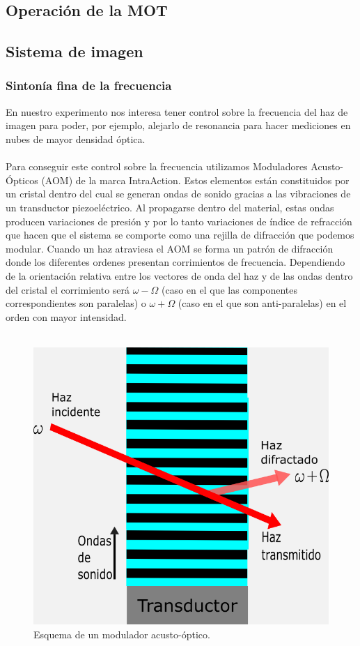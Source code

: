 \documentclass[12pt,twoside]{article}
\begin{document}
\subsection{Operación de la MOT}\label{operacion}



\subsection{Sistema de imagen}\label{Sisimag}

\subsubsection{Sintonía fina de la frecuencia}\label{Sintonia}

En nuestro experimento nos interesa tener control sobre la frecuencia del haz de imagen para poder, por ejemplo, alejarlo de resonancia para hacer mediciones en nubes de mayor densidad óptica.\\
\\
Para conseguir este control sobre la frecuencia utilizamos Moduladores Acusto-Ópticos (AOM) de la marca IntraAction. Estos elementos están constituidos por un cristal dentro del cual se generan ondas de sonido gracias a las vibraciones de un transductor piezoeléctrico. Al propagarse dentro del material, estas ondas producen variaciones de presión y por lo tanto variaciones de índice de refracción que hacen que el sistema se comporte como una rejilla de difracción que podemos modular. Cuando un haz atraviesa el AOM se forma un patrón de difracción donde los diferentes ordenes presentan corrimientos de frecuencia. Dependiendo de la orientación relativa entre los vectores de onda del haz y de las ondas dentro del cristal el corrimiento será $\omega - \Omega $ (caso en el que las componentes correspondientes son paralelas) o $\omega + \Omega $ (caso en el que son anti-paralelas) en el orden con mayor intensidad.\\
\\
\begin{figure}[h]
    \begin{center}
        \includegraphics[width=0.6\linewidth]{Esquemaaom.png}
    \end{center}
    \caption{Esquema de un modulador acusto-óptico. }
    \label{esqaom}
\end{figure} \\
\end{document}
